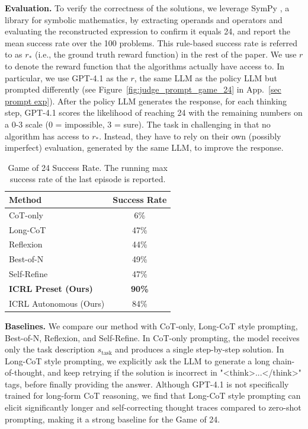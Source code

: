 \documentclass{article} %
\newcommand{\0}{\mathbf{0}}
\begin{document}
\textbf{Evaluation.} To verify the correctness of the solutions, we leverage SymPy \citep{sympy}, a library for symbolic mathematics, by extracting operands and operators and evaluating the reconstructed expression to confirm it equals 24, and report the mean success rate over the 100 problems. 
This rule-based success rate is referred to as $r_*$ (i.e., the ground truth reward function) in the rest of the paper.
We use $r$ to denote the reward function that the algorithms actually have access to.
In particular,
we use GPT-4.1 as the $r$,
the same LLM as the policy LLM but prompted differently (see Figure~\ref{fig:judge_prompt_game_24} in App.~\ref{sec prompt exp}).
After the policy LLM generates the response, for each thinking step, GPT-4.1 scores the likelihood of reaching 24 with the remaining numbers on a 0-3 scale (0 = impossible, 3 = sure).
The task in challenging in that no algorithm has access to $r_*$.
Instead,
they have to rely on their own (possibly imperfect) evaluation,
generated by the same LLM,
to improve the response. \\
\begin{table}
\centering
\caption{Game of 24 Success Rate. The running max success rate of the last episode is reported.}
\begin{tabular}{lc}
\toprule
Method       & Success Rate \\
\midrule
CoT-only     & 6\%     \\
Long-CoT     & 47\%    \\
Reflexion    & 44\%    \\
Best-of-N    & 49\%    \\
Self-Refine  & 47\%    \\
\textbf{ICRL Preset (Ours)}         & \textbf{90\%}    \\
ICRL Autonomous (Ours) & 84\% \\
\bottomrule 
\end{tabular}
\label{tab:game_24_success_rates}
\end{table}
\textbf{Baselines.} We compare our method with CoT-only, Long-CoT style prompting, Best-of-N, Reflexion, and Self-Refine. In CoT-only prompting, the model receives only the task description $s_{\text{task}}$ and produces a single step-by-step solution. In Long-CoT style prompting, we explicitly ask the LLM to generate a long chain-of-thought, and keep retrying if the solution is incorrect in "<think>...</think>" tags, before finally providing the answer.  Although GPT-4.1 is not specifically trained for long-form CoT reasoning, we find that Long-CoT style prompting can elicit significantly longer and self-correcting thought traces compared to zero-shot prompting, making it a strong baseline for the Game of 24.
\end{document}
